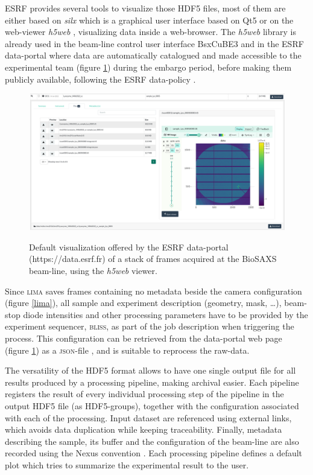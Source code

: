 \documentclass[preprint]{iucr}              %
\begin{document}
ESRF provides several tools to visualize those HDF5 files, most of them are either based on \textit{silx} \cite{silx} which is a graphical user interface based on Qt5 \cite{pyqt} or on the web-viewer \textit{h5web} \cite{h5web}, visualizing data inside a web-browser.
The \textit{h5web} library is already used in the beam-line control user interface BsxCuBE3 \cite{bm29_2022} and in the ESRF data-portal \cite{data-portal} where data are automatically catalogued and made accessible to the experimental team (figure \ref{dataportal}) during the embargo period, before making them publicly available, following the ESRF data-policy \cite{data-policy}. 

\begin{figure}
     \caption{Default visualization offered by the ESRF data-portal (https://data.esrf.fr) of a stack of frames acquired at the BioSAXS beam-line, using the \textit{h5web} viewer.}
     \includegraphics[width=12cm]{dataportal.eps}
     \label{dataportal}
\end{figure}

Since \textsc{lima} saves frames containing no metadata beside the camera configuration (figure \ref{lima}), all sample and experiment description (geometry, mask, \ldots), beam-stop diode intensities and other processing parameters have to be provided by the experiment sequencer, \textsc{bliss}, as part of the job description when triggering the process. 
This configuration can be retrieved from the data-portal web page (figure \ref{dataportal}) as a \textsc{json}-file \cite{json}, and is suitable to reprocess the raw-data.

The versatility of the HDF5 format allows to have one single output file for all results produced by a processing pipeline, making archival easier.
Each pipeline registers the result of every individual processing step of the pipeline in the output HDF5 file (as HDF5-groups), together with the configuration associated with each of the processing.
Input dataset are referenced using external links, which avoids data duplication while keeping traceability. 
Finally, metadata describing the sample, its buffer and the configuration of the beam-line are also recorded using the Nexus convention \cite{nexus}.
Each processing pipeline defines a default plot which tries to summarize the experimental result to the user.
\end{document}
